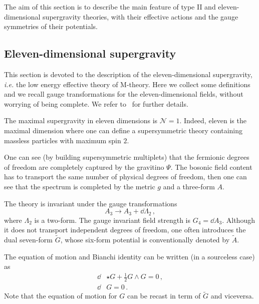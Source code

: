 \documentclass[debug]{phd}
\begin{document}
			The aim of this section is to describe the main feature of type II and eleven-dimensional supergravity theories, with their effective actions and the gauge symmetries of their potentials.
			\subsection{Eleven-dimensional supergravity}
				This section is devoted to the description of the eleven-dimensional supergravity, \emph{i.e.} the low energy effective theory of M-theory.
				Here we collect some definitions and we recall gauge transformations for the eleven-dimensional fields, without worrying of being complete. We refer to~\cite{polchinski, BeckerBeckerSchw} for further details.
				
				The maximal supergravity in eleven dimensions is $\mathcal{N}=1$.
				Indeed, eleven is the maximal dimension where one can define a supersymmetric theory containing massless particles with maximum spin $2$.
				
				One can see (by building supersymmetric multiplets) that the fermionic degrees of freedom are completely captured by the gravitino $\Psi$. 
				The bosonic field content has to transport the same number of physical degrees of freedom, then one can see that the spectrum is completed by the metric $g$ and a three-form $A$.
				
				The theory is invariant under the gauge transformations
						\begin{equation}
							A_3 \longrightarrow A_3 + \dd \Lambda_2 \, ,
						\end{equation}
				where $\Lambda_2$ is a two-form. 
				The gauge invariant field strength is $G_4 = \dd A_3$.
				Although it does not transport independent degrees of freedom, one often introduces the dual seven-form $\tilde G$, whose six-form potential is conventionally denoted by $\tilde A$.
				
				The equation of motion and Bianchi identity can be written (in a sourceless case) as
						\begin{equation}
							\begin{split}
								\dd &\star G + \frac{1}{2} G \wedge G = 0 \, , \\
								\dd &G = 0 \, .
							\end{split}
						\end{equation}
				Note that the equation of motion for $G$ can be recast in term of $\tilde{G}$ and viceversa.
				
\end{document}
